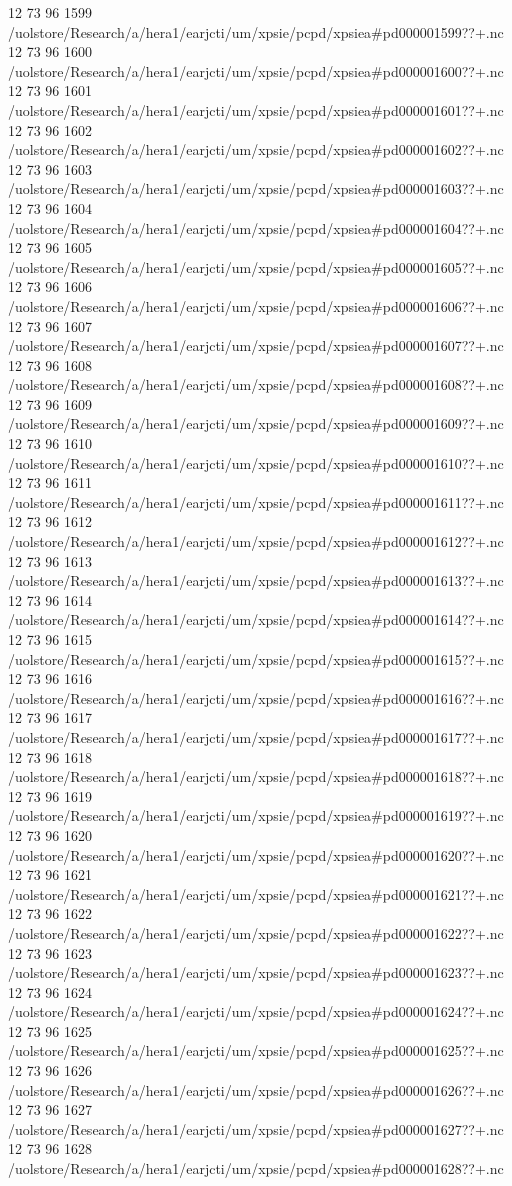 12 73 96
1599
/uolstore/Research/a/hera1/earjcti/um/xpsie/pcpd/xpsiea#pd000001599??+.nc
12 73 96
1600
/uolstore/Research/a/hera1/earjcti/um/xpsie/pcpd/xpsiea#pd000001600??+.nc
12 73 96
1601
/uolstore/Research/a/hera1/earjcti/um/xpsie/pcpd/xpsiea#pd000001601??+.nc
12 73 96
1602
/uolstore/Research/a/hera1/earjcti/um/xpsie/pcpd/xpsiea#pd000001602??+.nc
12 73 96
1603
/uolstore/Research/a/hera1/earjcti/um/xpsie/pcpd/xpsiea#pd000001603??+.nc
12 73 96
1604
/uolstore/Research/a/hera1/earjcti/um/xpsie/pcpd/xpsiea#pd000001604??+.nc
12 73 96
1605
/uolstore/Research/a/hera1/earjcti/um/xpsie/pcpd/xpsiea#pd000001605??+.nc
12 73 96
1606
/uolstore/Research/a/hera1/earjcti/um/xpsie/pcpd/xpsiea#pd000001606??+.nc
12 73 96
1607
/uolstore/Research/a/hera1/earjcti/um/xpsie/pcpd/xpsiea#pd000001607??+.nc
12 73 96
1608
/uolstore/Research/a/hera1/earjcti/um/xpsie/pcpd/xpsiea#pd000001608??+.nc
12 73 96
1609
/uolstore/Research/a/hera1/earjcti/um/xpsie/pcpd/xpsiea#pd000001609??+.nc
12 73 96
1610
/uolstore/Research/a/hera1/earjcti/um/xpsie/pcpd/xpsiea#pd000001610??+.nc
12 73 96
1611
/uolstore/Research/a/hera1/earjcti/um/xpsie/pcpd/xpsiea#pd000001611??+.nc
12 73 96
1612
/uolstore/Research/a/hera1/earjcti/um/xpsie/pcpd/xpsiea#pd000001612??+.nc
12 73 96
1613
/uolstore/Research/a/hera1/earjcti/um/xpsie/pcpd/xpsiea#pd000001613??+.nc
12 73 96
1614
/uolstore/Research/a/hera1/earjcti/um/xpsie/pcpd/xpsiea#pd000001614??+.nc
12 73 96
1615
/uolstore/Research/a/hera1/earjcti/um/xpsie/pcpd/xpsiea#pd000001615??+.nc
12 73 96
1616
/uolstore/Research/a/hera1/earjcti/um/xpsie/pcpd/xpsiea#pd000001616??+.nc
12 73 96
1617
/uolstore/Research/a/hera1/earjcti/um/xpsie/pcpd/xpsiea#pd000001617??+.nc
12 73 96
1618
/uolstore/Research/a/hera1/earjcti/um/xpsie/pcpd/xpsiea#pd000001618??+.nc
12 73 96
1619
/uolstore/Research/a/hera1/earjcti/um/xpsie/pcpd/xpsiea#pd000001619??+.nc
12 73 96
1620
/uolstore/Research/a/hera1/earjcti/um/xpsie/pcpd/xpsiea#pd000001620??+.nc
12 73 96
1621
/uolstore/Research/a/hera1/earjcti/um/xpsie/pcpd/xpsiea#pd000001621??+.nc
12 73 96
1622
/uolstore/Research/a/hera1/earjcti/um/xpsie/pcpd/xpsiea#pd000001622??+.nc
12 73 96
1623
/uolstore/Research/a/hera1/earjcti/um/xpsie/pcpd/xpsiea#pd000001623??+.nc
12 73 96
1624
/uolstore/Research/a/hera1/earjcti/um/xpsie/pcpd/xpsiea#pd000001624??+.nc
12 73 96
1625
/uolstore/Research/a/hera1/earjcti/um/xpsie/pcpd/xpsiea#pd000001625??+.nc
12 73 96
1626
/uolstore/Research/a/hera1/earjcti/um/xpsie/pcpd/xpsiea#pd000001626??+.nc
12 73 96
1627
/uolstore/Research/a/hera1/earjcti/um/xpsie/pcpd/xpsiea#pd000001627??+.nc
12 73 96
1628
/uolstore/Research/a/hera1/earjcti/um/xpsie/pcpd/xpsiea#pd000001628??+.nc
